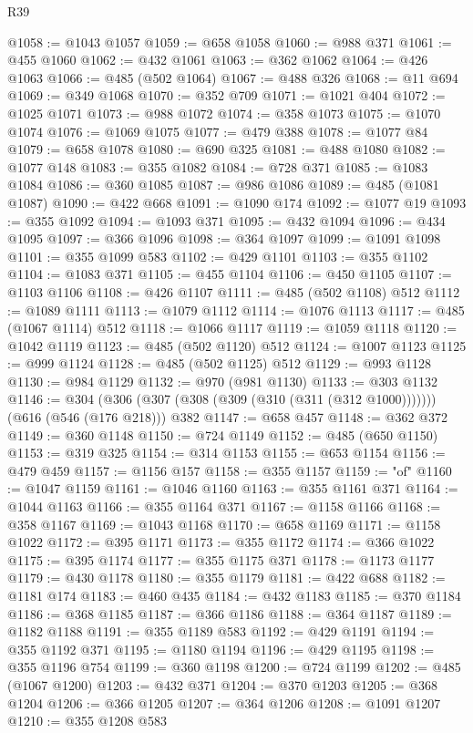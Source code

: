 \begin{lexlean}{R39}
\begin{coremodule}
@1058 := @1043 @1057
@1059 := @658 @1058
@1060 := @988 @371
@1061 := @455 @1060
@1062 := @432 @1061
@1063 := @362 @1062
@1064 := @426 @1063
@1066 := @485 (@502 @1064)
@1067 := @488 @326
@1068 := @11 @694
@1069 := @349 @1068
@1070 := @352 @709
@1071 := @1021 @404
@1072 := @1025 @1071
@1073 := @988 @1072
@1074 := @358 @1073
@1075 := @1070 @1074
@1076 := @1069 @1075
@1077 := @479 @388
@1078 := @1077 @84
@1079 := @658 @1078
@1080 := @690 @325
@1081 := @488 @1080
@1082 := @1077 @148
@1083 := @355 @1082
@1084 := @728 @371
@1085 := @1083 @1084
@1086 := @360 @1085
@1087 := @986 @1086
@1089 := @485 (@1081 @1087)
@1090 := @422 @668
@1091 := @1090 @174
@1092 := @1077 @19
@1093 := @355 @1092
@1094 := @1093 @371
@1095 := @432 @1094
@1096 := @434 @1095
@1097 := @366 @1096
@1098 := @364 @1097
@1099 := @1091 @1098
@1101 := @355 @1099 @583
@1102 := @429 @1101
@1103 := @355 @1102
@1104 := @1083 @371
@1105 := @455 @1104
@1106 := @450 @1105
@1107 := @1103 @1106
@1108 := @426 @1107
@1111 := @485 (@502 @1108) @512
@1112 := @1089 @1111
@1113 := @1079 @1112
@1114 := @1076 @1113
@1117 := @485 (@1067 @1114) @512
@1118 := @1066 @1117
@1119 := @1059 @1118
@1120 := @1042 @1119
@1123 := @485 (@502 @1120) @512
@1124 := @1007 @1123
@1125 := @999 @1124
@1128 := @485 (@502 @1125) @512
@1129 := @993 @1128
@1130 := @984 @1129
@1132 := @970 (@981 @1130)
@1133 := @303 @1132
@1146 := @304 (@306 (@307 (@308 (@309 (@310 (@311 (@312 @1000))))))) (@616 (@546 (@176 @218))) @382
@1147 := @658 @457
@1148 := @362 @372
@1149 := @360 @1148
@1150 := @724 @1149
@1152 := @485 (@650 @1150)
@1153 := @319 @325
@1154 := @314 @1153
@1155 := @653 @1154
@1156 := @479 @459
@1157 := @1156 @157
@1158 := @355 @1157
@1159 := "of"
@1160 := @1047 @1159
@1161 := @1046 @1160
@1163 := @355 @1161 @371
@1164 := @1044 @1163
@1166 := @355 @1164 @371
@1167 := @1158 @1166
@1168 := @358 @1167
@1169 := @1043 @1168
@1170 := @658 @1169
@1171 := @1158 @1022
@1172 := @395 @1171
@1173 := @355 @1172
@1174 := @366 @1022
@1175 := @395 @1174
@1177 := @355 @1175 @371
@1178 := @1173 @1177
@1179 := @430 @1178
@1180 := @355 @1179
@1181 := @422 @688
@1182 := @1181 @174
@1183 := @460 @435
@1184 := @432 @1183
@1185 := @370 @1184
@1186 := @368 @1185
@1187 := @366 @1186
@1188 := @364 @1187
@1189 := @1182 @1188
@1191 := @355 @1189 @583
@1192 := @429 @1191
@1194 := @355 @1192 @371
@1195 := @1180 @1194
@1196 := @429 @1195
@1198 := @355 @1196 @754
@1199 := @360 @1198
@1200 := @724 @1199
@1202 := @485 (@1067 @1200)
@1203 := @432 @371
@1204 := @370 @1203
@1205 := @368 @1204
@1206 := @366 @1205
@1207 := @364 @1206
@1208 := @1091 @1207
@1210 := @355 @1208 @583

\end{coremodule}
\end{lexlean}
